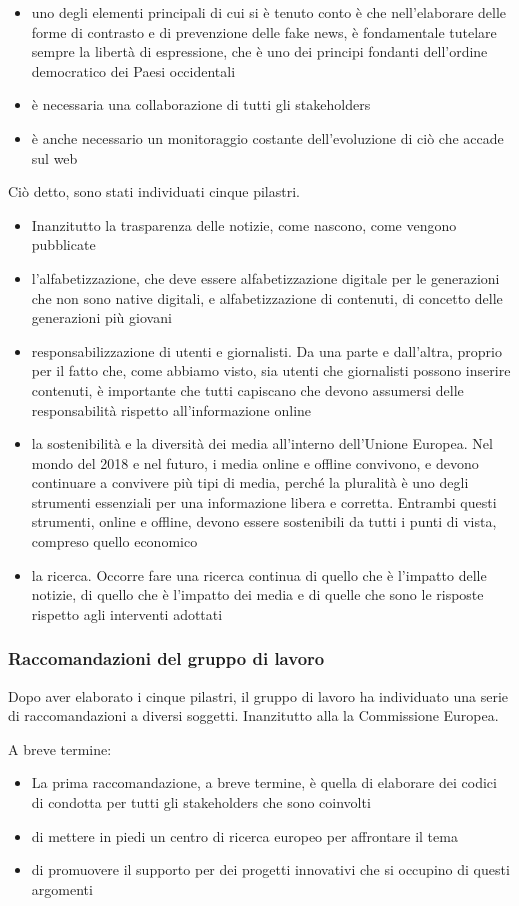 \begin{itemize}
    \item uno degli elementi principali di cui si è tenuto conto è che nell'elaborare delle forme di contrasto e di prevenzione delle fake news, è fondamentale tutelare sempre la libertà di espressione, che è uno dei principi fondanti dell'ordine democratico dei Paesi occidentali
    \item è necessaria una collaborazione di tutti gli stakeholders
    \item è anche necessario un monitoraggio costante dell'evoluzione di ciò che accade sul web
\end{itemize}

Ciò detto, sono stati individuati cinque pilastri. 

\begin{itemize}
    \item Inanzitutto la trasparenza delle notizie, come nascono, come vengono pubblicate
    \item l'alfabetizzazione, che deve essere alfabetizzazione digitale per le generazioni che non sono native digitali, e alfabetizzazione di contenuti, di concetto delle generazioni più giovani
    \item responsabilizzazione di utenti e giornalisti. Da una parte e dall'altra, proprio per il fatto che, come abbiamo visto, sia utenti che giornalisti possono inserire contenuti, è importante che tutti capiscano che devono assumersi delle responsabilità rispetto all'informazione online
    \item la sostenibilità e la diversità dei media all'interno dell'Unione Europea. Nel mondo del 2018 e nel futuro, i media online e offline convivono, e devono continuare a convivere più tipi di media, perché la pluralità è uno degli strumenti essenziali per una informazione libera e corretta. Entrambi questi strumenti, online e offline, devono essere sostenibili da tutti i punti di vista, compreso quello economico
    \item la ricerca. Occorre fare una ricerca continua di quello che è l'impatto delle notizie, di quello che è l'impatto dei media e di quelle che sono le risposte rispetto agli interventi adottati
\end{itemize}

\subsubsection{Raccomandazioni del gruppo di lavoro}
Dopo aver elaborato i cinque pilastri, il gruppo di lavoro ha individuato una serie di raccomandazioni a diversi soggetti. 
Inanzitutto alla la Commissione Europea.
\par
A breve termine: 
\begin{itemize}
    \item La prima raccomandazione, a breve termine, è quella di elaborare dei codici di condotta per tutti gli stakeholders che sono coinvolti
    \item di mettere in piedi un centro di ricerca europeo per affrontare il tema
    \item di promuovere il supporto per dei progetti innovativi che si occupino di questi argomenti
\end{itemize}

